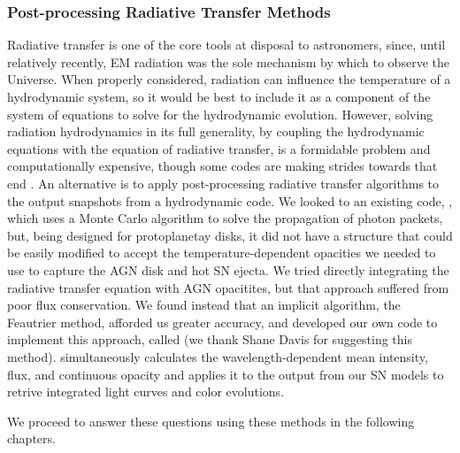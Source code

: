 \subsubsection{Post-processing Radiative Transfer Methods}
Radiative transfer is one of the core tools at disposal to astronomers, since, until relatively recently, EM radiation was the sole mechanism by which to observe the Universe.
When properly considered, radiation can influence the temperature of a hydrodynamic system, so it would be best to include it as a component of the system of equations to solve for the hydrodynamic evolution.
However, solving radiation hydrodynamics in its full generality, by coupling the hydrodynamic equations with the equation of radiative transfer, is a formidable problem and computationally expensive, though some codes are making strides towards that end \citep[e.g.,][]{Jiang+14,White+23}.
An alternative is to apply post-processing radiative transfer algorithms to the output snapshots from a hydrodynamic code.
We looked to an existing code, , which uses a Monte Carlo algorithm to solve the propagation of photon packets, but, being designed for protoplanetay disks, it did not have a structure that could be easily modified to accept the temperature-dependent opacities we needed to use to capture the AGN disk and hot SN ejecta.
We tried directly integrating the radiative transfer equation with AGN opacitites, but that approach suffered from poor flux conservation.
We found instead that an implicit algorithm, the Feautrier method, afforded us greater accuracy, and developed our own code to implement this approach, called  (we thank Shane Davis for suggesting this method).
 simultaneously calculates the wavelength-dependent mean intensity, flux, and continuous opacity and applies it to the output from our SN models to retrive integrated light curves and color evolutions.



\noindent We proceed to answer these questions using these methods in the following chapters.

